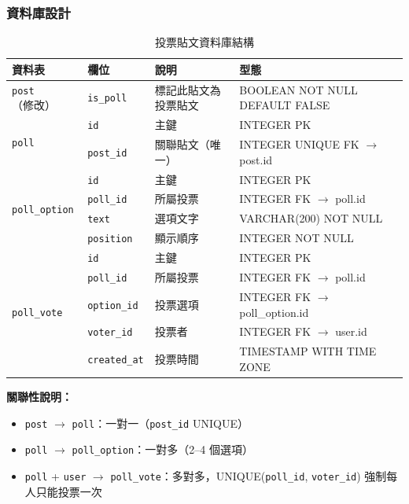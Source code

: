 \documentclass[12pt, a4paper]{article}
\begin{document}
\subsubsection*{資料庫設計}

\begin{table}[H]
\centering
\begin{tabularx}{\textwidth}{llXl}
\toprule
\textbf{資料表} & \textbf{欄位} & \textbf{說明} & \textbf{型態} \\
\midrule
\texttt{post}（修改） & \texttt{is\_poll} & 標記此貼文為投票貼文 & BOOLEAN NOT NULL DEFAULT FALSE \\
\midrule
\multirow{2}{*}{\texttt{poll}} & \texttt{id} & 主鍵 & INTEGER PK \\
 & \texttt{post\_id} & 關聯貼文（唯一） & INTEGER UNIQUE FK $\to$ post.id \\
\midrule
\multirow{4}{*}{\texttt{poll\_option}} & \texttt{id} & 主鍵 & INTEGER PK \\
 & \texttt{poll\_id} & 所屬投票 & INTEGER FK $\to$ poll.id \\
 & \texttt{text} & 選項文字 & VARCHAR(200) NOT NULL \\
 & \texttt{position} & 顯示順序 & INTEGER NOT NULL \\
\midrule
\multirow{5}{*}{\texttt{poll\_vote}} & \texttt{id} & 主鍵 & INTEGER PK \\
 & \texttt{poll\_id} & 所屬投票 & INTEGER FK $\to$ poll.id \\
 & \texttt{option\_id} & 投票選項 & INTEGER FK $\to$ poll\_option.id \\
 & \texttt{voter\_id} & 投票者 & INTEGER FK $\to$ user.id \\
 & \texttt{created\_at} & 投票時間 & TIMESTAMP WITH TIME ZONE \\
\bottomrule
\end{tabularx}
\caption{投票貼文資料庫結構}
\end{table}

\textbf{關聯性說明：}
\begin{itemize}[leftmargin=2em]
  \item \texttt{post} $\to$ \texttt{poll}：一對一（\texttt{post\_id} UNIQUE）
  \item \texttt{poll} $\to$ \texttt{poll\_option}：一對多（2--4 個選項）
  \item \texttt{poll} + \texttt{user} $\to$ \texttt{poll\_vote}：多對多，UNIQUE(\texttt{poll\_id}, \texttt{voter\_id}) 強制每人只能投票一次
\end{itemize}
\end{document}

